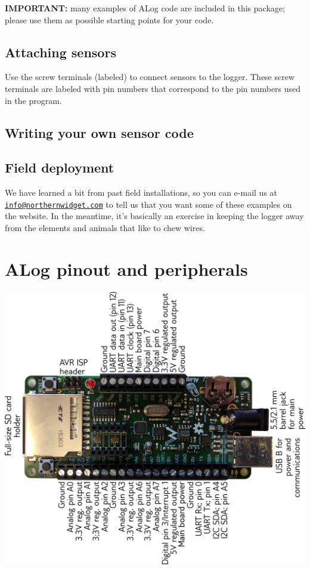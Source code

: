 {\bfseries I\+M\+P\+O\+R\+T\+A\+NT\+:} many examples of A\+Log code are included in this package; please use them as possible starting points for your code.\hypertarget{index_attaching_sensors}{}\subsection{Attaching sensors}\label{index_attaching_sensors}
Use the screw terminals (labeled) to connect sensors to the logger. These screw terminals are labeled with pin numbers that correspond to the pin numbers used in the program.\hypertarget{index_self_made_sensor_code}{}\subsection{Writing your own sensor code}\label{index_self_made_sensor_code}
\hypertarget{index_field_deployment}{}\subsection{Field deployment}\label{index_field_deployment}
We have learned a bit from past field installations, so you can e-\/mail us at \href{mailto:info@northernwidget.com}{\tt info@northernwidget.\+com} to tell us that you want some of these examples on the website. In the meantime, it’s basically an exercise in keeping the logger away from the elements and animals that like to chew wires.\hypertarget{index_pinout}{}\section{A\+Log pinout and peripherals}\label{index_pinout}
 
\begin{DoxyImage}
\includegraphics[width=\linewidth]{LoggerPinout.png}
\end{DoxyImage}


